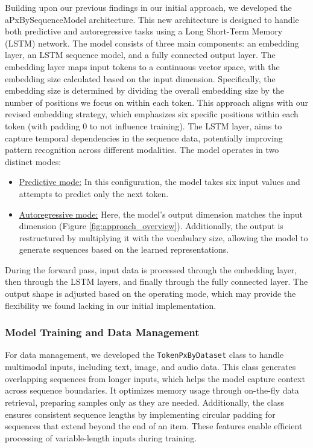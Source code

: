 \documentclass[10pt,a4paper]{article}
\begin{document}
Building upon our previous findings in our initial approach, we developed the aPxBySequenceModel architecture. This new architecture is designed to handle both predictive and autoregressive tasks using a Long Short-Term Memory (LSTM) network. The model consists of three main components: an embedding layer, an LSTM sequence model, and a fully connected output layer. The embedding layer maps input tokens to a continuous vector space, with the embedding size calculated based on the input dimension. Specifically, the embedding size is determined by dividing the overall embedding size by the number of positions we focus on within each token. This approach aligns with our revised embedding strategy, which emphasizes six specific positions within each token (with padding 0 to not influence training). The LSTM layer, aims to capture temporal dependencies in the sequence data, potentially improving pattern recognition across different modalities. The model operates in two distinct modes:

\begin{itemize}
    \item \underline{Predictive mode:} In this configuration, the model takes six input values and attempts to predict only the next token.

    \item \underline{Autoregressive mode:} Here, the model's output dimension matches the input dimension (Figure \ref{fig:approach_overview}). Additionally, the output is restructured by multiplying it with the vocabulary size, allowing the model to generate sequences based on the learned representations.
\end{itemize}

During the forward pass, input data is processed through the embedding layer, then through the LSTM layers, and finally through the fully connected layer. The output shape is adjusted based on the operating mode, which may provide the flexibility we found lacking in our initial implementation.

\subsubsection{Model Training and Data Management}

For data management, we developed the \texttt{TokenPxByDataset} class to handle multimodal inputs, including text, image, and audio data. This class generates overlapping sequences from longer inputs, which helps the model capture context across sequence boundaries. It optimizes memory usage through on-the-fly data retrieval, preparing samples only as they are needed. Additionally, the class ensures consistent sequence lengths by implementing circular padding for sequences that extend beyond the end of an item. These features enable efficient processing of variable-length inputs during training.
\end{document}
